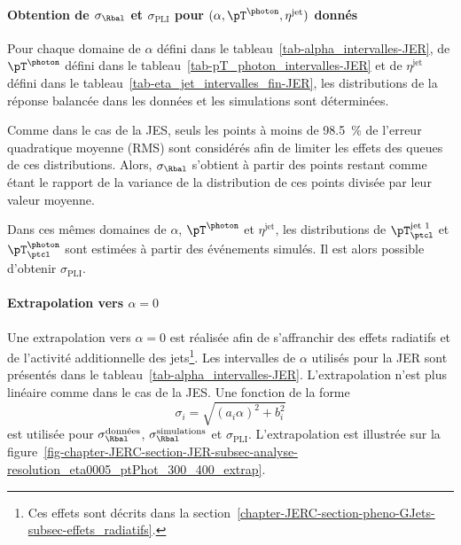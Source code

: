 \paragraph{Obtention de $\sigma_\Rbal$ et $\sigma_\text{PLI}$ pour $(\alpha, \pT^{\photon}, \eta^\text{jet})$ donnés}
Pour chaque domaine
de $\alpha$ défini dans le tableau~\ref{tab-alpha_intervalles-JER},
de $\pT^{\photon}$ défini dans le tableau~\ref{tab-pT_photon_intervalles-JER} et
de $\eta^\text{jet}$ défini dans le tableau~\ref{tab-eta_jet_intervalles_fin-JER},
les distributions de la réponse balancée dans les données et les simulations sont déterminées.
\par Comme dans le cas de la JES, seuls les points à moins de \SI{98.5}{\%} de l'erreur quadratique moyenne (RMS) sont considérés afin de limiter les effets des queues de ces distributions.
Alors, $\sigma_{\Rbal}$ s'obtient à partir des points restant comme étant le rapport de la variance de la distribution de ces points divisée par leur valeur moyenne.
\par
Dans ces mêmes domaines de $\alpha$, $\pT^{\photon}$ et $\eta^\text{jet}$, les distributions de $\pT^\text{jet 1}_\ptcl$ et $\pT^{\photon}_\ptcl$ sont estimées à partir des événements simulés.
Il est alors possible d'obtenir $\sigma_\text{PLI}$.
\paragraph{Extrapolation vers $\alpha=0$}
Une extrapolation vers $\alpha=0$ est réalisée afin de s'affranchir des effets radiatifs et de l'activité additionnelle des jets\footnote{Ces effets sont décrits dans la section~\ref{chapter-JERC-section-pheno-GJets-subsec-effets_radiatifs}.}.
Les intervalles de $\alpha$ utilisés pour la JER sont présentés dans le tableau~\ref{tab-alpha_intervalles-JER}.
L'extrapolation n'est plus linéaire comme dans le cas de la JES.
Une fonction de la forme
\begin{equation}
\sigma_i = \sqrt{(a_i\alpha)^2+b_i^2}
\end{equation}
est utilisée pour $\sigma_\Rbal^\text{données}$, $\sigma_\Rbal^\text{simulations}$ et $\sigma_\text{PLI}$.
L'extrapolation est illustrée sur la figure~\ref{fig-chapter-JERC-section-JER-subsec-analyse-resolution_eta0005_ptPhot_300_400_extrap}.
